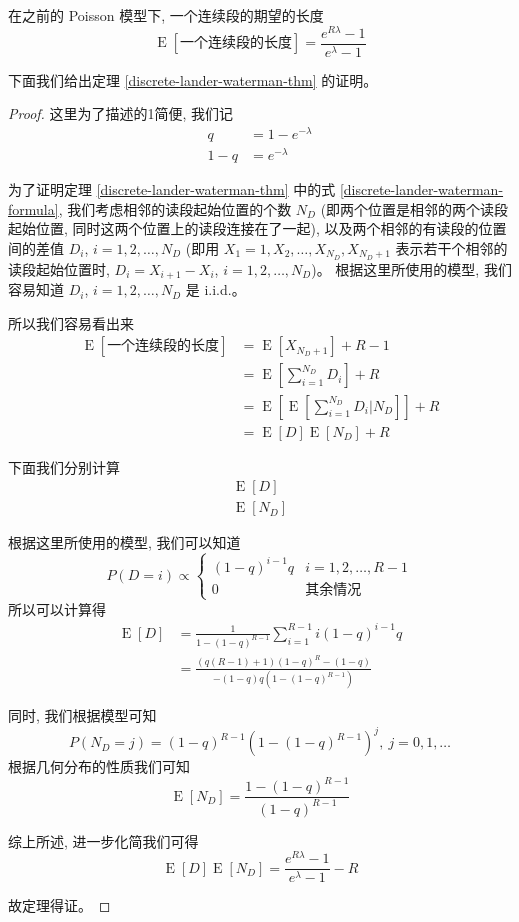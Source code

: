 \begin{thm}
\label{discrete-lander-waterman-thm}
在之前的 Poisson 模型下, 一个连续段的期望的长度
\begin{equation}
\label{discrete-lander-waterman-formula}
\operatorname{E}[\text{一个连续段的长度}] = \frac{e^{R\lambda} - 1}{e^\lambda - 1} 
\end{equation}
\end{thm}

下面我们给出定理 \ref{discrete-lander-waterman-thm} 的证明。 

\begin{proof}
这里为了描述的1简便, 我们记
\begin{align*}
q &= 1 - e^{-\lambda} \\
1-q &= e^{-\lambda}
\end{align*}

为了证明定理 \ref{discrete-lander-waterman-thm} 
中的式 \eqref{discrete-lander-waterman-formula}, 
我们考虑相邻的读段起始位置的个数 $N_D$ (即两个位置是相邻的两个读段起始位置, 
同时这两个位置上的读段连接在了一起), 
以及两个相邻的有读段的位置间的差值 $D_i$, $i=1,2,\ldots,N_D$ 
(即用 $X_1=1,X_2,\ldots,X_{N_D}, X_{N_D+1}$ 表示若干个相邻的读段起始位置时, 
$D_i=X_{i+1}-X_i$, $i=1,2,\ldots,N_D$)。 
根据这里所使用的模型, 我们容易知道 $D_i$, $i=1,2,\ldots,N_D$ 是 i.i.d.。 

所以我们容易看出来
\begin{align*}
\operatorname{E}[\text{一个连续段的长度}] &= \operatorname{E}[X_{N_D + 1}] +R-1 \\
&= \operatorname{E}[\sum_{i=1}^{N_D} D_i] +R \\
&= \operatorname{E}[\operatorname{E}[\sum_{i=1}^{N_D} D_i|N_D]] +R \\
&= \operatorname{E}[D] \operatorname{E}[N_D] +R
\end{align*}

下面我们分别计算
\begin{align*}
\operatorname{E}[D] \\
\operatorname{E}[N_D]
\end{align*}

根据这里所使用的模型, 我们可以知道
\[
P(D=i) \propto \begin{cases}
(1-q)^{i-1} q & i=1,2,\ldots,R-1 \\
0 & \text{其余情况}
\end{cases}
\]
所以可以计算得
\begin{align*}
\operatorname{E}[D] &= \frac{1}{1-(1-q)^{R-1}} \sum_{i=1}^{R-1} i (1-q)^{i-1} q \\
&= \frac{(q(R-1)+1)(1-q)^R-(1-q)}{-(1-q)q(1-(1-q)^{R-1})}
\end{align*}

同时, 我们根据模型可知
\[
P(N_D=j) = (1-q)^{R-1}(1-(1-q)^{R-1})^{j},\ j=0,1,\ldots
\]
根据几何分布的性质我们可知
\[
\operatorname{E}[N_D]=\frac{1-(1-q)^{R-1}}{(1-q)^{R-1}}
\]

综上所述, 进一步化简我们可得
\[
\operatorname{E}[D] \operatorname{E}[N_D] = \frac{e^{R\lambda} -1}{e^{\lambda}-1} -R
\]

故定理得证。 

\end{proof}

